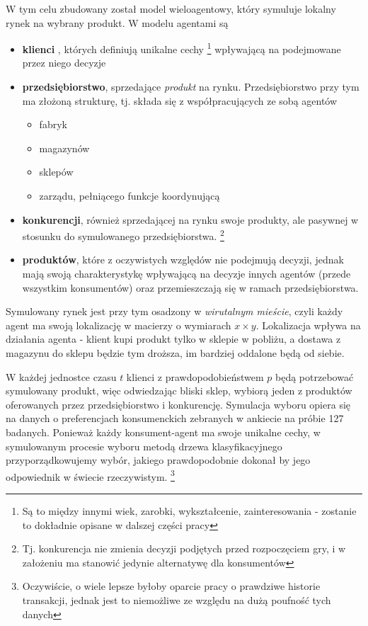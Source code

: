 \documentclass{article}
\begin{document}
W tym celu zbudowany został model wieloagentowy, który symuluje lokalny rynek na wybrany produkt. W modelu agentami są 
\begin{itemize} 
	\item \textbf{klienci} , których definiują unikalne cechy \footnote{Są to między innymi wiek, zarobki, wykształcenie, zainteresowania - zostanie to dokładnie opisane w dalszej części pracy}  wpływającą na podejmowane przez niego decyzje 
	\item \textbf{przedsiębiorstwo}, sprzedające \textit{produkt} na rynku. Przedsiębiorstwo przy tym ma złożoną strukturę, tj. składa się z współpracujących ze sobą agentów 
		\begin{itemize}
			\item fabryk
			\item magazynów
			\item sklepów 
			\item zarządu, pełniącego funkcje koordynującą 
		\end{itemize}
	\item \textbf{konkurencji}, również sprzedającej na rynku swoje produkty, ale pasywnej w stosunku do symulowanego przedsiębiorstwa. \footnote{Tj. konkurencja nie zmienia decyzji podjętych przed rozpoczęciem gry, i w założeniu ma stanowić jedynie alternatywę dla konsumentów} 
	\item \textbf{produktów}, które z oczywistych względów nie podejmują decyzji, jednak mają swoją charakterystykę wpływającą na decyzje innych agentów (przede wszystkim konsumentów) oraz przemieszczają się w ramach przedsiębiorstwa. 
\end{itemize}

Symulowany rynek jest przy tym osadzony w \textit{wirutalnym mieście}, czyli każdy agent ma swoją lokalizację w macierzy o wymiarach $x \times y$. Lokalizacja wpływa na działania agenta - klient kupi produkt tylko w sklepie w pobliżu, a dostawa z magazynu do sklepu będzie tym droższa, im bardziej oddalone będą od siebie. 

W każdej jednostce czasu $ t $ klienci z prawdopodobieństwem $ p $ będą potrzebować symulowany produkt, więc odwiedzając bliski sklep, wybiorą jeden z produktów oferowanych przez przedsiębiorstwo i konkurencję. Symulacja wyboru opiera się na danych o preferencjach konsumenckich zebranych w ankiecie na próbie 127 badanych. Ponieważ każdy konsument-agent ma swoje unikalne cechy, w symulowanym procesie wyboru metodą drzewa klasyfikacyjnego przyporządkowujemy wybór, jakiego prawdopodobnie dokonał by jego odpowiednik w świecie rzeczywistym. \footnote{Oczywiście, o wiele lepsze byłoby oparcie pracy o prawdziwe historie transakcji, jednak jest to niemożliwe ze względu na dużą poufność tych danych}
\end{document}
